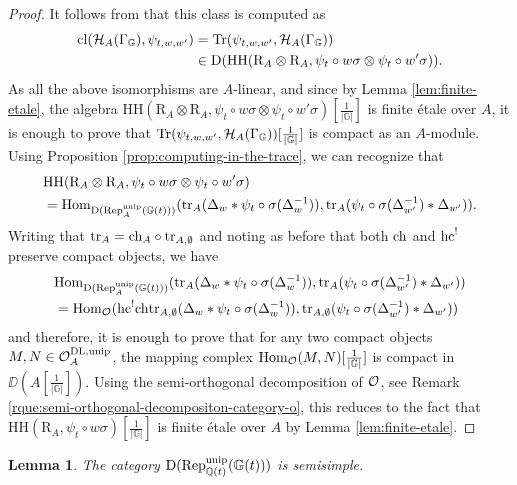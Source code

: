 \documentclass[a4paper, 10pt, oneside, reqno]{amsart}
\theoremstyle{plain}
\newtheorem{lem}[thm]{Lemma}
\theoremstyle{definition}
\theoremstyle{remark}
\newcommand{\Gbb}{\mathbb{G}}
\newcommand{\RR}{\mathrm{R}}
\newcommand{\HHH}{\mathrm{HH}}
\begin{document}
\begin{proof}
It follows from \cite[Theorem 3.8.5]{ToyModel}  that this class is computed as 
$$\begin{aligned}\cl(\Hcal_A(\Gamma_{\Gbb}), \psi_{t,w,w'}) &= \Tr(\psi_{t,w,w'}, \Hcal_{A}(\Gamma_{\Gbb})) \\ &\in \DD(\HHH(\RR_A \otimes \RR_A, \psi_t \circ w\sigma \otimes \psi_t \circ w'\sigma)).\end{aligned}$$
As all the above isomorphisms are $A$-linear, and since by Lemma \ref{lem:finite-etale}, the algebra $\HHH(\RR_A \otimes \RR_A, \psi_t \circ w\sigma \otimes \psi_t \circ w'\sigma)[\frac{1}{|\Gbb|}]$ is finite étale over $A$, it is enough to prove that $\Tr(\psi_{t,w,w'}, \Hcal_{A}(\Gamma_{\Gbb}))[\frac{1}{|\Gbb|}]$ is compact as an $A$-module. Using Proposition \ref{prop:computing-in-the-trace}, we can recognize that 
\begin{align*}
&\HHH(\RR_A \otimes \RR_A, \psi_t \circ w\sigma \otimes \psi_t \circ w'\sigma) \\
&= \Hom_{\DD(\Rep_A^{\unip}(\Gbb(t)))}(\tr_A(\Delta_w *  \psi_t \circ \sigma (\Delta_w^{-1})), \tr_A(\psi_t \circ \sigma (\Delta_{w'}^{-1})  * \Delta_{w'})).
\end{align*}
Writing that $\mathrm{tr}_A = \mathrm{ch}_A \circ \mathrm{tr}_{A,\emptyset}$ and noting as before that both $\mathrm{ch}$ and $\mathrm{hc}^!$ preserve compact objects, we have 
\begin{align*}
&\Hom_{\DD(\Rep_A^{\unip}(\Gbb(t)))}(\tr_A(\Delta_w *  \psi_t \circ \sigma (\Delta_w^{-1})), \tr_A(\psi_t \circ \sigma (\Delta_{w'}^{-1})  * \Delta_{w'})) \\
&= \Hom_{\Ocal}(\hc^!\ch\tr_{A,\emptyset}(\Delta_w *  \psi_t \circ \sigma (\Delta_w^{-1})), \tr_{A,\emptyset}(\psi_t \circ \sigma (\Delta_{w'}^{-1})  * \Delta_{w'}))
\end{align*}
and therefore, it is enough to prove that for any two compact objects $M,N \in \mathcal{O}_{A}^{\mathrm{DL}, \mathrm{unip}}$, the mapping complex $\Hom_{\Ocal}(M,N)[\frac{1}{|\Gbb|}]$ is compact in $\DD(A[\frac{1}{|\Gbb|}])$. Using the semi-orthogonal decomposition of $\mathcal{O}$, see Remark \ref{rque:semi-orthogonal-decompositon-category-o}, this reduces to the fact that $\HHH(\RR_A, \psi_t \circ w\sigma)[\frac{1}{|\Gbb|}]$ is finite étale over $A$ by Lemma \ref{lem:finite-etale}.
\end{proof}

\begin{lem}\label{lem:generic-semisimplicity}
The category $\DD(\Rep^{\unip}_{\Q(t)}(\Gbb(t)))$ is semisimple.
\end{lem}
\end{document}
